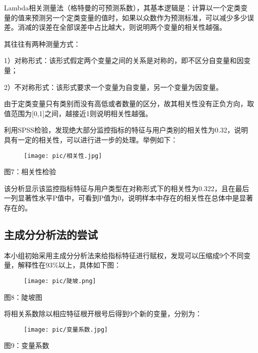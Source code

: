 \documentclass{ctexart}
\begin{document}
    Lambda相关测量法（格特曼的可预测系数），其基本逻辑是：计算以一个定类变量的值来预测另一个定类变量的值时，如果以众数作为预测标准，可以减少多少误差。消减的误差在全部误差中占比越大，则说明两个变量的相关性越强。

    其往往有两种测量方式：

    1）对称形式：该形式假定两个变量之间的关系是对称的，即不区分自变量和因变量；

    2）不对称形式：该形式要求一个变量为自变量，另一个变量为因变量。

    由于定类变量只有类别而没有高低或者数量的区分，故其相关性没有正负方向，取值范围为[0,1]之间，越接近1则说明相关性越强。

    利用SPSS检验，发现绝大部分监控指标的特征与用户类别的相关性为0.32，说明具有一定的相关性，可以进行进一步的处理。举例如下：

    \begin{center}
        \begin{figure}[H]
            \begin{center}
                \texttt{[image: pic/相关性.jpg]}
            \end{center}
        \end{figure}
        图7：相关性检验
    \end{center}

    该分析显示该监控指标特征与用户类型在对称形式下的相关性为0.322，且在最后一列显著性水平P值中，可看到P值为0，说明样本中存在的相关性在总体中是显著存在的。

    \subsection{主成分分析法的尝试}

    本小组初始采用主成分分析法来给指标特征进行赋权，发现可以压缩成9个不同变量，解释性在93\%以上，具体如下图：

    \begin{center}
        \begin{figure}[H]
            \begin{center}
                \texttt{[image: pic/陡坡.png]}
            \end{center}
        \end{figure}
        图8：陡坡图
    \end{center}

    将相关系数除以相应特征根开根号后得到9个新的变量，分别为：

    \begin{center}
        \begin{figure}[H]
            \begin{center}
                \texttt{[image: pic/变量系数.jpg]}
            \end{center}
        \end{figure}
        图9：变量系数
    \end{center}
\end{document}
